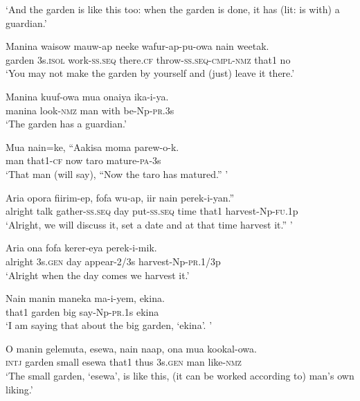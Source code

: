 \glt ‘And the garden is like this too: when the garden is done, it has (lit: is with) a guardian.’ \\
\z


\ea
\gll  Manina  waisow  mauw-ap  neeke  wafur-ap-pu-owa          nain  weetak. \\
garden  3s.\textsc{isol}  work-\textsc{ss.seq}  there.\textsc{cf}  throw-\textsc{ss.seq}-\textsc{cmpl}-\textsc{nmz}  that1  no \\


\glt ‘You may not make the garden by yourself and (just) leave it there.’ \\
\z


\ea
\gll  Manina  kuuf-owa  mua  onaiya  ika-i-ya. \\
manina  look-\textsc{nmz}  man  with  be-Np-\textsc{pr}.3s \\
\glt ‘The garden has a guardian.’ \\
\z


\ea
\gll  Mua  nain=ke,  “Aakisa  moma  parew-o-k. \\
man  that1-\textsc{cf}  now  taro  mature-\textsc{pa}-3s \\
\glt ‘That man (will say), “Now the taro has matured.” ’ \\
\z


\ea
\gll  Aria  opora  fiirim-ep,  fofa  wu-ap,  iir  nain  perek-i-yan.” \\
alright  talk  gather-\textsc{ss.seq}  day  put-\textsc{ss.seq}  time  that1  harvest-Np-\textsc{fu}.1p \\
\glt ‘Alright, we will discuss it, set a date and at that time harvest it.” ’ \\
\z


\ea
\gll  Aria  ona  fofa  kerer-eya  perek-i-mik. \\
alright  3s.\textsc{gen}  day  appear-2/3s  harvest-Np-\textsc{pr}.1/3p \\
\glt ‘Alright when the day comes we harvest it.’ \\
\z


\ea
\gll  Nain  manin  maneka  ma-i-yem,  ekina. \\
that1  garden  big  say-Np-\textsc{pr}.1s  ekina \\
\glt ‘I am saying that about the big garden, ‘ekina’. ’ \\
\z


\ea
\gll  O  manin  gelemuta,  esewa,  nain  naap,  ona  mua  kookal-owa. \\
\textsc{intj}  garden  small  esewa  that1  thus  3s.\textsc{gen}  man  like-\textsc{nmz} \\
\glt ‘The small garden, ‘esewa’, is like this, (it can be worked according to) man’s own liking.’ \\
\z


